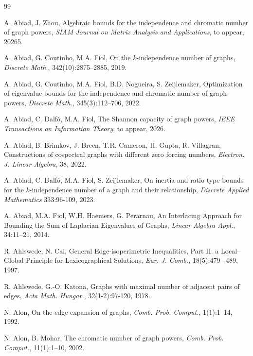 \documentclass[a4paper,11pt]{article}
\theoremstyle{definition}
\begin{document}


\begin{thebibliography}{99}


 A. Abiad, J. Zhou,
Algebraic bounds for the independence and chromatic number of graph powers, \emph{SIAM Journal on Matrix Analysis and Applications}, to appear, 20265. 


 A. Abiad, G. Coutinho, M.A. Fiol, On the $k$-independence number of graphs, \emph{Discrete Math.}, 342(10):2875--2885, 2019.

 A. Abiad, G. Coutinho, M.A. Fiol, B.D. Nogueira, S. Zeijlemaker, Optimization of eigenvalue bounds for the independence and chromatic number of graph powers, \emph{Discrete Math.}, 345(3):112--706, 2022.

A. Abiad, C. Dalf\'o, M.A. Fiol,
The Shannon capacity of graph powers,
\emph{IEEE Transactions on Information Theory}, to appear, 2026. 



 A. Abiad, B. Brimkov, J. Breen, T.R. Cameron, H. Gupta, R. Villagran, Constructions of cospectral graphs with different zero forcing numbers, \emph{Electron. J. Linear Algebra}, 38, 2022.

 A. Abiad, C. Dalf\'o, M.A. Fiol, S. Zeijlemaker,
On inertia and ratio type bounds for the $k$-independence number of a graph and their relationship,
\emph{Discrete Applied Mathematics} 333:96-109, 2023. 

 A. Abiad, M.A. Fiol, W.H. Haemers, G. Perarnau,
An Interlacing Approach for Bounding the Sum of Laplacian Eigenvalues of Graphs,
\emph{Linear Algebra Appl.}, 34:11--21, 2014.

 R. Ahlswede, N. Cai, General Edge-isoperimetric Inequalities, Part II: a Local–Global Principle for Lexicographical Solutions, \emph{Eur. J. Comb.}, 18(5):479–-489, 1997.

 R. Ahlswede, G.-O. Katona, Graphs with maximal number of adjacent pairs of edges, \textit{Acta Math. Hungar.}, 32(1-2):97-120, 1978.

 N. Alon, On the edge-expansion of graphs, \emph{Comb. Prob. Comput.}, 1(1):1--14, 1992.


 N. Alon, B. Mohar, The chromatic number of graph powers, \emph{Comb. Prob. Comput.}, 11(1):1--10, 2002.


\end{thebibliography}
\end{document}
